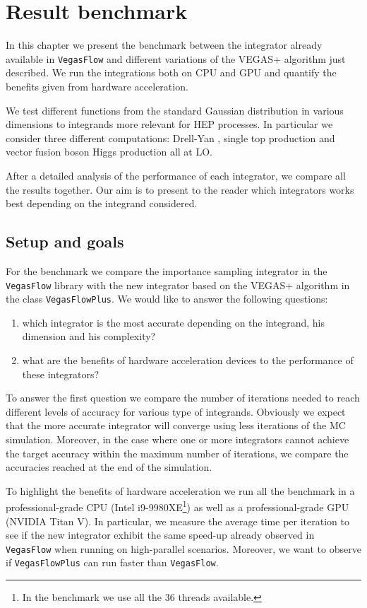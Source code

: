 \documentclass[../main/main.tex]{subfiles}
\begin{document}
\chapter{Result benchmark}
	
In this chapter we present the benchmark between the integrator already available in \texttt{VegasFlow} and different variations of the VEGAS+ algorithm just described. We run the integrations both on CPU and GPU and quantify the benefits given from hardware acceleration.

We test different functions from the standard Gaussian distribution in various dimensions to integrands more relevant for HEP processes. In particular we consider three different computations: Drell-Yan \cite{Carrazza_2020}, single top production \cite{Brucherseifer_2014} and vector fusion boson Higgs production \cite{Carrazza_2021} all at LO.

After a detailed analysis of the performance of each integrator, we compare all the results together. Our aim is to present to the reader which integrators works best depending on the integrand considered.
\section{Setup and goals}
For the benchmark we compare the importance sampling integrator in the \texttt{VegasFlow} library with the new integrator based on the VEGAS+ algorithm  in the class \texttt{VegasFlowPlus}.
We would like to answer the following questions:
\begin{enumerate}
	\item which integrator is the most accurate depending on the integrand, his dimension and his complexity?
	\item what are the benefits of hardware acceleration devices to the performance of these integrators?
\end{enumerate}

To answer the first question we compare the number of iterations needed to reach different levels of accuracy for various type of integrands.
Obviously we expect that the more accurate integrator will converge using less iterations of the MC simulation. Moreover, in the case where one or more integrators cannot achieve the target accuracy within the maximum number of iterations, we compare the accuracies reached at the end of the simulation.

To highlight the benefits of hardware acceleration we run all the benchmark in a professional-grade CPU (Intel i9-9980XE\footnote{In the benchmark we use all the 36 threads available.}) as well as a professional-grade GPU (NVIDIA Titan V). In particular, we measure the average time per iteration to see if the new integrator exhibit the same speed-up already observed in \texttt{VegasFlow} when running on 
high-parallel scenarios. Moreover, we want to observe if \texttt{VegasFlowPlus} can run faster than \texttt{VegasFlow}.
\end{document}
